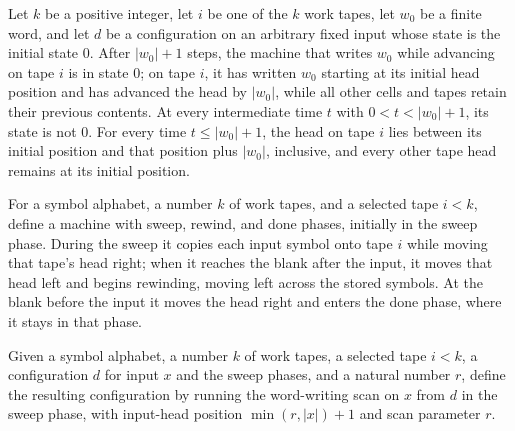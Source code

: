 \begin{theorem}
\label{Turing.writeAdvTM_run_ofCfg}
\leanok
{}
Let $k$ be a positive integer, let $i$ be one of the $k$ work tapes, let $w_0$ be a
finite word, and let $d$ be a configuration on an arbitrary fixed input whose state is
the initial state $0$. After $|w_0|+1$ steps, the machine that writes $w_0$ while
advancing on tape $i$ is in state $0$; on tape $i$, it has written $w_0$ starting at its
initial head position and has advanced the head by $|w_0|$, while all other cells and
tapes retain their previous contents. At every intermediate time $t$ with $0<t<|w_0|+1$,
its state is not $0$. For every time $t\le |w_0|+1$, the head on tape $i$ lies between
its initial position and that position plus $|w_0|$, inclusive, and every other tape
head remains at its initial position.
\end{theorem}

\begin{definition}
\label{Turing.inputCopyTM}
\leanok
{}
For a symbol alphabet, a number $k$ of work tapes, and a selected tape $i<k$, define a
machine with sweep, rewind, and done phases, initially in the sweep phase. During the
sweep it copies each input symbol onto tape $i$ while moving that tape's head right;
when it reaches the blank after the input, it moves that head left and begins rewinding,
moving left across the stored symbols. At the blank before the input it moves the head
right and enters the done phase, where it stays in that phase.
\end{definition}

\begin{definition}
\label{Turing.scanCopyF}
\leanok
{}
Given a symbol alphabet, a number $k$ of work tapes, a selected tape $i<k$, a
configuration $d$ for input $x$ and the sweep phases, and a natural number $r$, define
the resulting configuration by running the word-writing scan on $x$ from $d$ in the
sweep phase, with input-head position $\min(r,|x|)+1$ and scan parameter $r$.
\end{definition}

